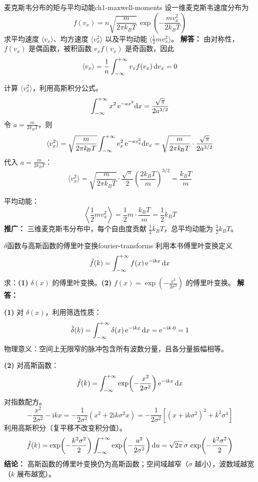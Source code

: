 \begin{example}{麦克斯韦分布的矩与平均动能}{ch1-maxwell-moments}
设一维麦克斯韦速度分布为
\[
f(v_x) = n\sqrt{\frac{m}{2\pi k_{\!B}T}}\,\exp\!\left(-\frac{mv_x^2}{2k_{\!B}T}\right)
\]
求平均速度 $\langle v_x\rangle$、均方速度 $\langle v_x^2\rangle$ 以及平均动能 $\langle \frac{1}{2}mv_x^2\rangle$。
\tcblower
\textbf{解答：}
由对称性，$f(v_x)$ 是偶函数，被积函数 $v_x f(v_x)$ 是奇函数，因此
\[
\langle v_x\rangle = \frac{1}{n}\int_{-\infty}^{+\infty} v_x f(v_x)\,\mathrm{d} v_x = 0
\]

计算 $\langle v_x^2\rangle$，利用高斯积分公式。
\[
\int_{-\infty}^{+\infty} x^2 \,\mathrm{e}^{-ax^2}\mathrm{d} x = \frac{\sqrt{\pi}}{2a^{3/2}}
\]
令 $a = \frac{m}{2k_{\!B}T}$，则
\[
\langle v_x^2\rangle = \sqrt{\frac{m}{2\pi k_{\!B}T}}\int_{-\infty}^{+\infty} v_x^2 \,\mathrm{e}^{-av_x^2}\mathrm{d} v_x = \sqrt{\frac{m}{2\pi k_{\!B}T}}\cdot\frac{\sqrt{\pi}}{2a^{3/2}}
\]
代入 $a = \frac{m}{2k_{\!B}T}$：
\[
\langle v_x^2\rangle = \sqrt{\frac{m}{2\pi k_{\!B}T}}\cdot\frac{\sqrt{\pi}}{2}\left(\frac{2k_{\!B}T}{m}\right)^{3/2} = \frac{k_{\!B}T}{m}
\]

平均动能：
\[
\left\langle\frac{1}{2}mv_x^2\right\rangle = \frac{1}{2}m\cdot\frac{k_{\!B}T}{m} = \frac{1}{2}k_{\!B}T
\]
\textbf{推广：} 三维麦克斯韦分布中，每个自由度贡献 $\frac{1}{2}k_{\!B}T$，总平均动能为 $\frac{3}{2}k_{\!B}T$。
\end{example}

\begin{example}{$\delta$函数与高斯函数的傅里叶变换}{fourier-transforms}
利用本书傅里叶变换定义
\[
\tilde{f}(k) = \int_{-\infty}^{+\infty} f(x)\,\mathrm{e}^{-\mathrm{i} kx}\,\mathrm{d} x
\]
求：\textbf{(1)} $\delta(x)$ 的傅里叶变换。\textbf{(2)} $f(x)=\exp\!\left(-\frac{x^2}{2\sigma^2}\right)$ 的傅里叶变换。
\tcblower
\textbf{解答：}

\textbf{(1)} 对 $\delta(x)$，利用筛选性质：
\[
\tilde{\delta}(k) = \int_{-\infty}^{+\infty} \delta(x)\,\mathrm{e}^{-\mathrm{i} kx}\,\mathrm{d} x = \mathrm{e}^{-\mathrm{i} k\cdot 0} = 1
\]
物理意义：空间上无限窄的脉冲包含所有波数分量，且各分量振幅相等。

\textbf{(2)} 对高斯函数：
\[
\tilde{f}(k) = \int_{-\infty}^{+\infty} \exp\!\left(-\frac{x^2}{2\sigma^2}\right)\mathrm{e}^{-\mathrm{i} kx}\,\mathrm{d} x
\]
对指数配方。
\[
-\frac{x^2}{2\sigma^2} - \mathrm{i}kx = -\frac{1}{2\sigma^2}\left(x^2 + 2\mathrm{i}k\sigma^2 x\right) = -\frac{1}{2\sigma^2}\left[(x+\mathrm{i}k\sigma^2)^2 + k^2\sigma^4\right]
\]
利用高斯积分（复平移不改变积分值）。
\[
\tilde{f}(k) = \exp\!\left(-\frac{k^2\sigma^2}{2}\right)\int_{-\infty}^{+\infty} \exp\!\left(-\frac{u^2}{2\sigma^2}\right)\mathrm{d} u = \sqrt{2\pi}\,\sigma\,\exp\!\left(-\frac{k^2\sigma^2}{2}\right)
\]
\textbf{结论：} 高斯函数的傅里叶变换仍为高斯函数；空间域越窄（$\sigma$ 越小），波数域越宽（$k$ 展布越宽）。
\end{example}


